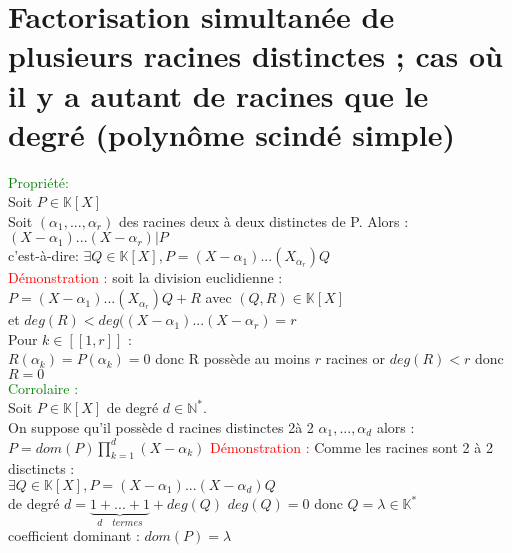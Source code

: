 \documentclass{article}
\begin{document}
\section{Factorisation simultanée de plusieurs racines distinctes ; cas où il y a autant de racines que le degré (polynôme scindé simple)}
\textcolor{green}{Propriété:} \\ 
Soit $P \in \mathbb K [X]$ \\
Soit $(\alpha_1,...,\alpha_r)$ des racines deux à deux distinctes de P. Alors : \\ 
$(X-\alpha_1)...(X-\alpha_r)|P$ \\ 
c'est-à-dire: $\exists Q \in \mathbb K  [X], P=(X-\alpha_1)...(X_\alpha_r)Q$\\ 
\textcolor{red}{Démonstration :} soit la division euclidienne : \\
$P=(X-\alpha_1)...(X_\alpha_r)Q +R$  avec $(Q,R) \in \mathbb K [X]$ \\
et $deg(R)<deg((X-\alpha_1) ...(X- \alpha_r)=r$ \\
Pour $k \in [[1,r]]$ : \\
$R(\alpha_k)=P(\alpha_k)=0$ donc R possède au moins $r$ racines or $deg(R)<r$ donc $R=0$\\
\textcolor{green}{Corrolaire :} \\
Soit $P \in \mathbb K [X]$ de degré $d \in \mathbb N^*$. \\
On suppose qu'il possède d racines distinctes 2à 2 $\alpha_1,...,\alpha_d$ alors : \\
$P=dom(P) \prod_{k=1}^d (X-\alpha_k)$
\textcolor{red}{Démonstration : } Comme les racines sont 2 à 2 disctincts : \\
$\exists Q \in \mathbb K [X], P=(X- \alpha_1)...(X- \alpha_d)Q$ \\ 
de degré $d=\underbrace{1+ ...+1}_{d \quad termes} + deg(Q)$ $deg(Q)=0$ donc $Q=\lambda \in \mathbb K^*$ \\ 
coefficient dominant : $dom(P)=\lambda$
\end{document}
